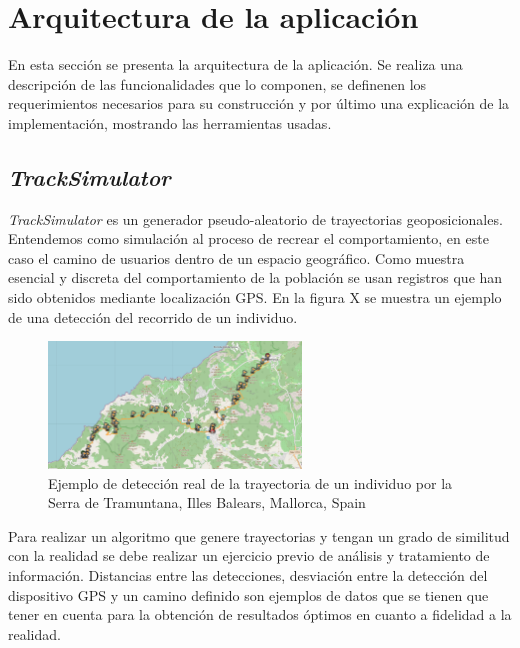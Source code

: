 
\chapter{Arquitectura de la aplicación}
En esta sección se presenta la arquitectura de la aplicación. Se realiza una 
descripción de las funcionalidades que lo componen, se definenen los requerimientos necesarios 
para su construcción y por último una explicación de la implementación, mostrando las herramientas 
usadas.

\section{\textit{TrackSimulator}}
\textit{TrackSimulator} es un generador pseudo-aleatorio de trayectorias geoposicionales. Entendemos como 
simulación al proceso de recrear el comportamiento, en este caso el camino de usuarios dentro de un espacio 
geográfico. Como muestra esencial y discreta del comportamiento de la población se usan registros que han sido 
obtenidos mediante localización \ac{GPS}. En la figura X se muestra un ejemplo de una detección del recorrido de 
un individuo.

\begin{figure}[htb]
\begin{center}
\includegraphics[width=0.6\textwidth]{./Imagenes/RealTrackDetection.png}
\caption{Ejemplo de detección real de la trayectoria de un individuo por la Serra de Tramuntana, Illes 
Balears, Mallorca, Spain}
\label{TrackExample1}
\end{center}
\end{figure}
Para realizar un algoritmo que genere trayectorias y tengan un grado de similitud con la realidad se debe 
realizar un ejercicio previo de análisis y tratamiento de información. Distancias entre las detecciones, 
desviación entre la detección del dispositivo \ac{GPS} y un camino definido son ejemplos de datos que se 
tienen que tener en cuenta para la obtención de resultados óptimos en cuanto a fidelidad a la realidad.

